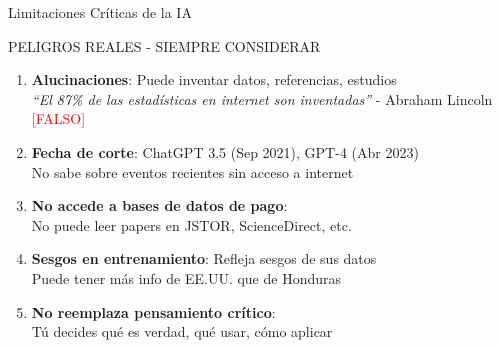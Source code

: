\documentclass[aspectratio=169,xcolor={dvipsnames}]{beamer}
\begin{document}
	\begin{frame}{Limitaciones Críticas de la IA}
		
		\begin{alertblock}{PELIGROS REALES - SIEMPRE CONSIDERAR}
			\begin{enumerate}
				\item \textbf{Alucinaciones}: Puede inventar datos, referencias, estudios\\
				\textit{``El 87\% de las estadísticas en internet son inventadas''} - Abraham Lincoln \textcolor{red}{[FALSO]}
				
				\item \textbf{Fecha de corte}: ChatGPT 3.5 (Sep 2021), GPT-4 (Abr 2023)\\
				No sabe sobre eventos recientes sin acceso a internet
				
				\item \textbf{No accede a bases de datos de pago}:\\
				No puede leer papers en JSTOR, ScienceDirect, etc.
				
				\item \textbf{Sesgos en entrenamiento}: Refleja sesgos de sus datos\\
				Puede tener más info de EE.UU. que de Honduras
				
				\item \textbf{No reemplaza pensamiento crítico}:\\
				Tú decides qué es verdad, qué usar, cómo aplicar
			\end{enumerate}
		\end{alertblock}
		
	\end{frame}
	
\end{document}
